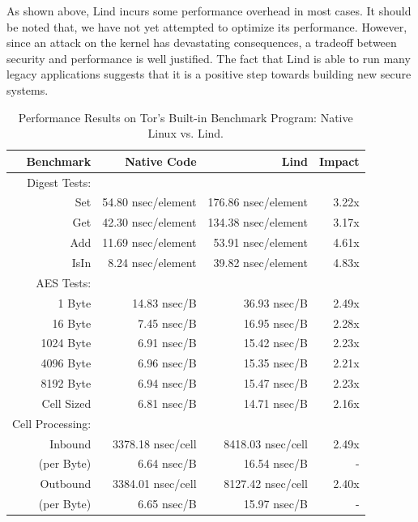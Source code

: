 As shown above,  Lind incurs some performance overhead in most cases.
It should be noted that, we have not  yet attempted to optimize its performance.
However, since an attack on the kernel has devastating
consequences, %
a tradeoff between security and performance is well justified.
The fact that Lind is able to run many  legacy applications
suggests that it
is a positive step towards building new secure systems.

\begin{table}
\centering
\scriptsize
\caption{Performance Results on Tor's Built-in Benchmark Program: Native
Linux vs. Lind.}
\begin{tabular}{|r|r|r|r|}
  \hline
  {\bf Benchmark} & {\bf Native Code} & {\bf Lind} & {\bf Impact}  \\
  \hline
  Digest Tests: & & & \\
  Set & 54.80 nsec/element & 176.86 nsec/element & 3.22x \\
  Get & 42.30 nsec/element & 134.38 nsec/element & 3.17x \\
  Add & 11.69 nsec/element & 53.91 nsec/element & 4.61x \\
  IsIn & 8.24 nsec/element & 39.82 nsec/element & 4.83x \\
  \hline
  AES Tests: & & & \\
  1 Byte & 14.83 nsec/B & 36.93 nsec/B & 2.49x \\
  16 Byte & 7.45 nsec/B & 16.95 nsec/B & 2.28x \\
  1024 Byte & 6.91 nsec/B & 15.42 nsec/B & 2.23x \\
  4096 Byte & 6.96 nsec/B & 15.35 nsec/B & 2.21x \\
  8192 Byte & 6.94 nsec/B & 15.47 nsec/B & 2.23x \\
  Cell Sized & 6.81 nsec/B & 14.71 nsec/B & 2.16x \\
  \hline
  Cell Processing: & & & \\
  Inbound & 3378.18 nsec/cell & 8418.03 nsec/cell & 2.49x \\
  (per Byte) & 6.64 nsec/B & 16.54 nsec/B & - \\
  Outbound & 3384.01 nsec/cell & 8127.42 nsec/cell & 2.40x \\
  (per Byte) & 6.65 nsec/B & 15.97 nsec/B & - \\
  \hline
\end{tabular}
\label{table:performance_tor}
\end{table}
